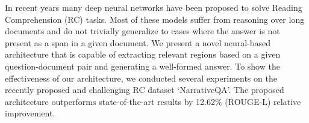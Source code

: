 In recent years many deep neural networks have been proposed to solve Reading Comprehension (RC) tasks. Most of these models suffer from reasoning over long documents and do not trivially generalize to cases where the answer is not present as a span in a given document. We present a novel neural-based architecture that is capable of extracting relevant regions based on a given question-document pair and generating a well-formed answer. To show the effectiveness of our architecture, we conducted several experiments on the recently proposed and challenging RC dataset `NarrativeQA'. The proposed architecture outperforms state-of-the-art results by 12.62\% (ROUGE-L) relative improvement.
